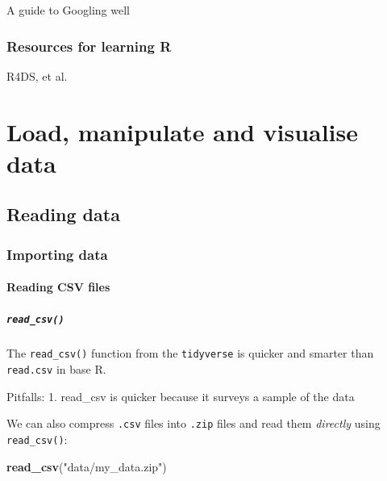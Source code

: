 \documentclass[
]{book}
\newenvironment{Shaded}{\begin{snugshade}}{\end{snugshade}}
\newcommand{\KeywordTok}[1]{\textcolor[rgb]{0.13,0.29,0.53}{\textbf{#1}}}
\newcommand{\NormalTok}[1]{#1}
\newcommand{\StringTok}[1]{\textcolor[rgb]{0.31,0.60,0.02}{#1}}
\begin{document}
A guide to Googling well

\hypertarget{resources-for-learning-r}{%
\section{Resources for learning R}\label{resources-for-learning-r}}

R4DS, et al.

\hypertarget{part-load-manipulate-and-visualise-data}{%
\part{Load, manipulate and visualise data}\label{part-load-manipulate-and-visualise-data}}

\hypertarget{reading-data}{%
\chapter{Reading data}\label{reading-data}}

\hypertarget{importing-data}{%
\section{Importing data}\label{importing-data}}

\hypertarget{reading-csv-files}{%
\subsection{Reading CSV files}\label{reading-csv-files}}

\hypertarget{read_csv}{%
\subsubsection{\texorpdfstring{\texttt{read\_csv()}}{read\_csv()}}\label{read_csv}}

The \texttt{read\_csv()} function from the \texttt{tidyverse} is quicker and smarter than \texttt{read.csv} in base R.

Pitfalls:
1. read\_csv is quicker because it surveys a sample of the data

We can also compress \texttt{.csv} files into \texttt{.zip} files and read them \emph{directly} using \texttt{read\_csv()}:

\begin{Shaded}
\begin{Highlighting}[]
\KeywordTok{read\_csv}\NormalTok{(}\StringTok{"data/my\_data.zip"}\NormalTok{)}
\end{Highlighting}
\end{Shaded}
\end{document}
